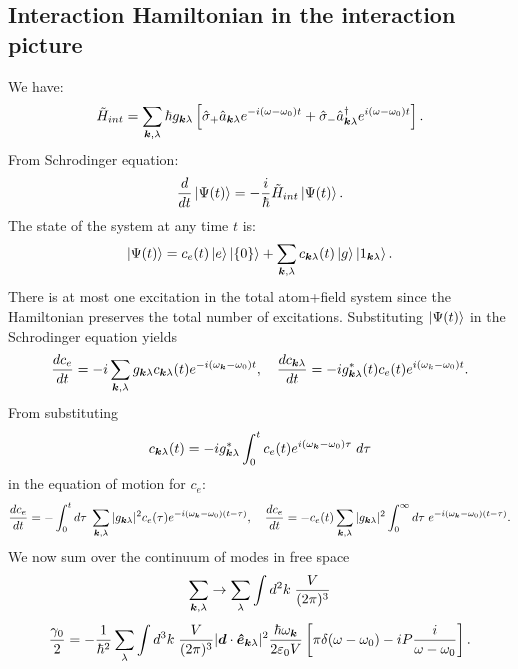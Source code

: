 \subsection{Interaction Hamiltonian in the interaction picture}
We have:
\begin{align}
    \tilde{H}_{int}=\sum_{\bm{k},\lambda}\hbar g_{\bm{k}\lambda}\left[\hat{\sigma}_+\hat{a}_{\bm{k}\lambda}e^{-i(\omega-\omega_0)t}+\hat{\sigma}_-\hat{a}^\dagger_{\bm{k}\lambda}e^{i(\omega-\omega_0)t}\right].
\end{align}
From Schrodinger equation:
\begin{align*}
    \frac{d}{dt}\left|\Psi(t)\right\rangle=-\frac{i}{\hbar}\tilde{H}_{int}\left|\Psi(t)\right\rangle.
\end{align*}
The state of the system at any time $t$ is:
\begin{align*}
    \left|\Psi(t)\right\rangle=c_e(t)\left|e\right\rangle\left|\{0\}\right\rangle+\sum_{\bm{k},\lambda}c_{\bm{k}\lambda}(t)\left|g\right\rangle\left|1_{\bm{k}\lambda}\right\rangle.
\end{align*}
There is at most one excitation in the total atom+field system since the Hamiltonian preserves the total number of excitations.
Substituting $\left|\Psi(t)\right\rangle$ in the Schrodinger equation yields 
\begin{align*}
    \frac{dc_e}{dt}=-i\sum_{\bm{k},\lambda}g_{\bm{k}\lambda}c_{\bm{k}\lambda}(t)e^{-i(\omega_{\bm{k}}-\omega_0)t},\quad
    \frac{dc_{\bm{k}\lambda}}{dt}=-ig^*_{\bm{k}\lambda}(t)c_e(t)e^{i(\omega_k-\omega_0)t}.
\end{align*}
From substituting
\begin{align*}
    c_{\bm{k}\lambda}(t)=-ig^*_{\bm{k}\lambda}\int_0^t c_e(t)e^{i(\omega_{\bm{k}}-\omega_0)\tau}\;d\tau
\end{align*}
in the equation of motion for $c_e$:
\begin{align*}
    \frac{dc_e}{dt}=-\int_0^td\tau\;\sum_{\bm{k},\lambda}|g_{\bm{k}\lambda}|^2c_e(\tau)e^{-i(\omega_{\bm{k}}-\omega_0)(t-\tau)},\quad
    \frac{dc_e}{dt}=-c_e(t)\sum_{\bm{k},\lambda}|g_{\bm{k}\lambda}|^2\int_0^\infty d\tau\;e^{-i(\omega_{\bm{k}}-\omega_0)(t-\tau)}.
\end{align*}
We now sum over the continuum of modes in free space 
\begin{align}
    \sum_{\bm{k},\lambda}\to\sum_{\lambda}\int d^2k\;\frac{V}{(2\pi)^3}
\end{align}
\begin{align*}
    \frac{\gamma_0}{2}=-\frac{1}{\hbar^2}\sum_{\lambda}\int d^3k\;\frac{V}{(2\pi)^3}|\bm{d}\cdot\bm{\hat{e}}_{\bm{k}\lambda}|^2\frac{\hbar\omega_{\bm{k}}}{2\varepsilon_0V}
    \left[\pi\delta(\omega-\omega_0)-iP\frac{i}{\omega-\omega_0}\right].
\end{align*}
